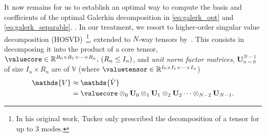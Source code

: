 It now remains for us to establish an optimal way to compute the basis and coefficients of the optimal Galerkin decomposition in \eqref{eq:galerk_opt} and \eqref{eq:galerk_separable}. 
%
. In our treatment, we resort to higher-order singular value decomposition (HOSVD)~\cite{Tucker66}\footnote{In his original work, Tucker only prescribed the decomposition of a tensor for up to 3 modes.}, extended to $N$-way tensors by~\cite{KapteynNWayTensors1986}. This consists in decomposing it into the product of a core tensor, $\valuecore \in \mathbb{R}^{R_0 \times R_1 \times \cdots \times R_n}, \, (R_n \le I_n)$, and \textit{unit norm factor matrices}, $\bm{U}_{n=0}^{N-1}$ of size $I_n \times R_n$ are of  $\mathds{V}$ (where $\valuetensor \in \mathbb{R}^{I_0 \times I_1 \times \cdots \times I_n}$)
%
\begin{subequations}
	\begin{align}
		\mathds{V}  &\approx \mathds{\hat{V}}  \\
		&= \valuecore \otimes_0 \mathbf{U}_0 \otimes_1 \mathbf{U}_1 \otimes_2 \mathbf{U}_2 \cdots \otimes_{N-2} \mathbf{U}_{N-1}.
	\end{align}
	\label{eq:tucker}
\end{subequations}
%
